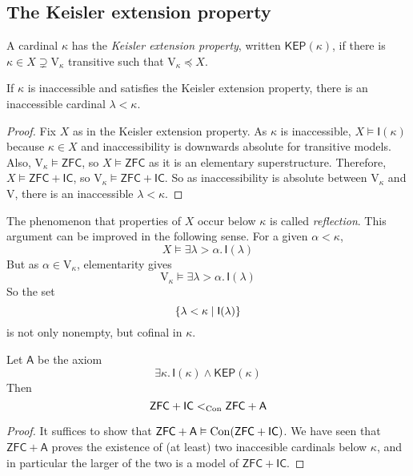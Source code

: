 \subsection{The Keisler extension property}
\begin{definition}
    A cardinal \( \kappa \) has the \emph{Keisler extension property}, written \( \mathsf{KEP}(\kappa) \), if there is \( \kappa \in X \supsetneq \mathrm{V}_\kappa \) transitive such that \( \mathrm{V}_\kappa \preceq X \).
\end{definition}
\begin{proposition}
    If \( \kappa \) is inaccessible and satisfies the Keisler extension property, there is an inaccessible cardinal \( \lambda < \kappa \).
\end{proposition}
\begin{proof}
    Fix \( X \) as in the Keisler extension property.
    As \( \kappa \) is inaccessible, \( X \vDash \mathsf{I}(\kappa) \) because \( \kappa \in X \) and inaccessibility is downwards absolute for transitive models.
    Also, \( \mathrm{V}_\kappa \vDash \mathsf{ZFC} \), so \( X \vDash \mathsf{ZFC} \) as it is an elementary superstructure.
    Therefore, \( X \vDash \mathsf{ZFC} + \mathsf{IC} \), so \( \mathrm{V}_\kappa \vDash \mathsf{ZFC} + \mathsf{IC} \).
    So as inaccessibility is absolute between \( \mathrm{V}_\kappa \) and \( \mathrm{V} \), there is an inaccessible \( \lambda < \kappa \).
\end{proof}
The phenomenon that properties of \( X \) occur below \( \kappa \) is called \emph{reflection}.
This argument can be improved in the following sense.
For a given \( \alpha < \kappa \),
\[ X \vDash \exists \lambda > \alpha.\, \mathsf{I}(\lambda) \]
But as \( \alpha \in \mathrm{V}_\kappa \), elementarity gives
\[ \mathrm{V}_\kappa \vDash \exists \lambda > \alpha.\, \mathsf{I}(\lambda) \]
So the set
\[ \qty{\lambda < \kappa \mid \mathsf{I}(\lambda)} \]
is not only nonempty, but cofinal in \( \kappa \).
\begin{corollary}
    Let \( \mathsf{A} \) be the axiom
    \[ \exists \kappa.\, \mathsf{I}(\kappa) \wedge \mathsf{KEP}(\kappa) \]
    Then
    \[ \mathsf{ZFC} + \mathsf{IC} <_{\operatorname{Con}} \mathsf{ZFC} + \mathsf{A} \]
\end{corollary}
\begin{proof}
    It suffices to show that \( \mathsf{ZFC} + \mathsf{A} \vDash \operatorname{Con}(\mathsf{ZFC} + \mathsf{IC}) \).
    We have seen that \( \mathsf{ZFC} + \mathsf{A} \) proves the existence of (at least) two inaccesible cardinals below \( \kappa \), and in particular the larger of the two is a model of \( \mathsf{ZFC} + \mathsf{IC} \).
\end{proof}
